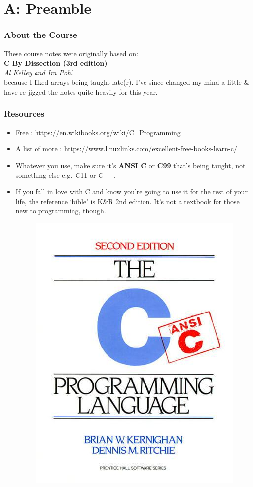 \section{A: Preamble}

\begin{frame}%
\frametitle{About the Course}
%
These course notes were originally based on:\\[1em]
{\bf C By Dissection (3rd edition)}\\
{\it Al Kelley and Ira Pohl}\\[1em]

because I liked arrays being taught late(r).
I've since changed my mind a little \& have re-jigged the notes quite heavily for this year.
\end{frame}

\begin{frame}%
\frametitle{Resources}
\begin{itemize}[<+->]
\item Free : \url{https://en.wikibooks.org/wiki/C_Programming}
\item A list of more : \url{https://www.linuxlinks.com/excellent-free-books-learn-c/}
\item Whatever you use, make sure it's {\bf ANSI C} or {\bf C99} that's being taught, not something else e.g.\ C11 or C++.
\item If you fall in love with C and  know you're going to use it for the rest of your life, the reference `bible' is K\&R 2nd edition.
It's not a textbook for those new to programming, though.
\begin{figure}[h]
\centerline{
\includegraphics[scale=0.25]{../Figs/9780131103627.jpg}
}
\end{figure}
\end{itemize}
\end{frame}

